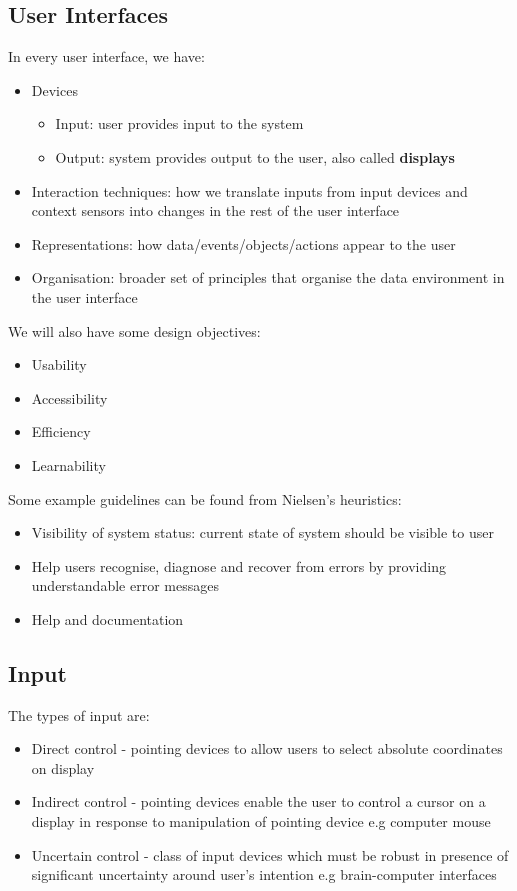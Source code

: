 \documentclass{article}
\begin{document}
\subsection{User Interfaces}
In every user interface, we have:
\begin{itemize}
    \item Devices
    \begin{itemize}
        \item Input: user provides input to the system
        \item Output: system provides output to the user, also called \textbf{displays}
    \end{itemize}
    \item Interaction techniques: how we translate inputs from input devices and context sensors into changes in the rest of the user interface
    \item Representations: how data/events/objects/actions appear to the user
    \item Organisation: broader set of principles that organise the data environment in the user interface
\end{itemize}
We will also have some design objectives:
\begin{itemize}
    \item Usability
    \item Accessibility
    \item Efficiency
    \item Learnability
\end{itemize}
Some example guidelines can be found from Nielsen's heuristics:
\begin{itemize}
    \item Visibility of system status: current state of system should be visible to user
    \item Help users recognise, diagnose and recover from errors by providing understandable error messages
    \item Help and documentation
\end{itemize}
\subsection{Input}
The types of input are:
\begin{itemize}
    \item Direct control - pointing devices to allow users to select absolute coordinates on display
    \item Indirect control - pointing devices enable the user to control a cursor on a display in response to manipulation of pointing device e.g computer mouse
    \item Uncertain control - class of input devices which must be robust in presence of significant uncertainty around user's intention e.g brain-computer interfaces
\end{itemize}
\end{document}
